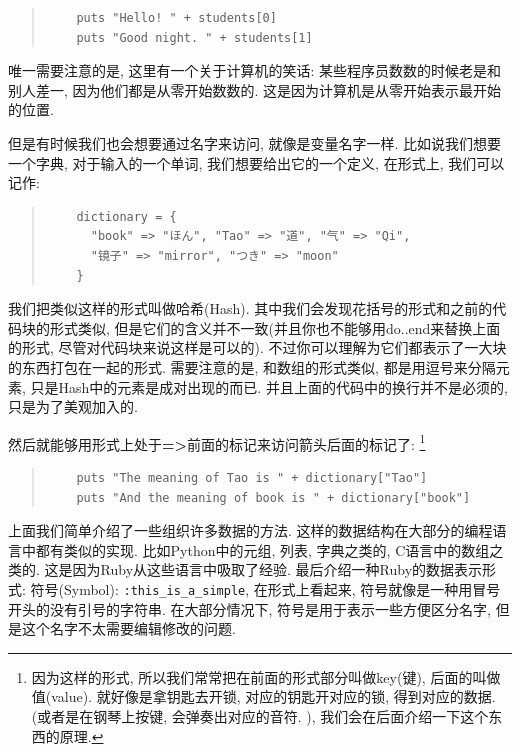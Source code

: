 \begin{quotation}
  \begin{verbatim}
    puts "Hello! " + students[0]
    puts "Good night. " + students[1]
  \end{verbatim}
\end{quotation}

唯一需要注意的是, 这里有一个关于计算机的笑话: 某些程序员数数的时候老是和别人差一, 因为他们都是从零开始数数的. 这是因为计算机是从零开始表示最开始的位置. 

但是有时候我们也会想要通过名字来访问, 就像是变量名字一样. 比如说我们想要一个字典, 对于输入的一个单词, 我们想要给出它的一个定义, 在形式上, 我们可以记作: 

\begin{quotation}
  \begin{verbatim}
    dictionary = {
      "book" => "ほん", "Tao" => "道", "气" => "Qi", 
      "镜子" => "mirror", "つき" => "moon"
    }
  \end{verbatim}
\end{quotation}

我们把类似这样的形式叫做哈希(Hash). 其中我们会发现花括号的形式和之前的代码块的形式类似, 但是它们的含义并不一致(并且你也不能够用do..end来替换上面的形式, 尽管对代码块来说这样是可以的). 不过你可以理解为它们都表示了一大块的东西打包在一起的形式. 需要注意的是, 和数组的形式类似, 都是用逗号来分隔元素, 只是Hash中的元素是成对出现的而已. 并且上面的代码中的换行并不是必须的, 只是为了美观加入的. 

然后就能够用形式上处于\textbf{=>}前面的标记来访问箭头后面的标记了: \footnote{因为这样的形式, 所以我们常常把在前面的形式部分叫做key(键), 后面的叫做值(value). 就好像是拿钥匙去开锁, 对应的钥匙开对应的锁, 得到对应的数据. (或者是在钢琴上按键, 会弹奏出对应的音符. ), 我们会在后面介绍一下这个东西的原理. }

\begin{quotation}
  \begin{verbatim}
    puts "The meaning of Tao is " + dictionary["Tao"]
    puts "And the meaning of book is " + dictionary["book"]
  \end{verbatim}
\end{quotation}

上面我们简单介绍了一些组织许多数据的方法. 这样的数据结构在大部分的编程语言中都有类似的实现. 比如Python中的元组, 列表, 字典之类的, C语言中的数组之类的. 这是因为Ruby从这些语言中吸取了经验. 最后介绍一种Ruby的数据表示形式: 符号(Symbol): \texttt{:this_is_a_simple}, 在形式上看起来, 符号就像是一种用冒号开头的没有引号的字符串. 在大部分情况下, 符号是用于表示一些方便区分名字, 但是这个名字不太需要编辑修改的问题. 

